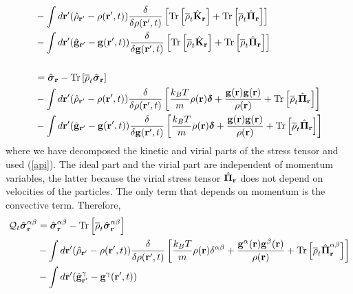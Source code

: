 \documentclass[b5paper,openright,11pt]{book}
\begin{document}
\begin{appendices}
\begin{align}
&-\int d{\bf r}'(\hat{\rho}_{{\bf r}'}-\rho({\bf r}',t))
\frac{\delta}{\delta \rho({\bf r}',t)}
\left[{\rm Tr}\left[\overline{\rho}_{t} \hat{\bf K}_{{\bf r}}\right]+{\rm Tr}\left[\overline{\rho}_{t} \hat{\boldsymbol{\Pi}}_{{\bf r}}\right]\right]
\nonumber\\
&-\int d{\bf r}'(\hat{\bf g}_{{\bf r}'}-{\bf g}({\bf r}',t))
\frac{\delta}{\delta {\bf g}({\bf r}',t)}
\left[{\rm Tr}\left[\overline{\rho}_{t} \hat{\bf K}_{{\bf r}}\right]+{\rm Tr}\left[\overline{\rho}_{t} \hat{\boldsymbol{\Pi}}_{{\bf r}}\right]\right]
\nonumber\\
\nonumber\\
&=\hat{\boldsymbol{\sigma}}_{{\bf r}}- {\rm Tr}\left[\overline{\rho}_{t} \hat{\boldsymbol{\sigma}}_{{\bf r}}\right]
\nonumber\\
&-\int d{\bf r}'(\hat{\rho}_{{\bf r}'}-\rho({\bf r}',t))
\frac{\delta}{\delta \rho({\bf r}',t)}
\left[
 \frac{k_BT}{m}\rho({\bf r})\boldsymbol{\delta}
+\frac{{\bf g}({\bf r}){\bf g}({\bf r})}{\rho({\bf r})}
+{\rm Tr}\left[\overline{\rho}_{t} \hat{\boldsymbol{\Pi}}_{{\bf r}}\right]\right]
\nonumber\\
&-\int d{\bf r}'(\hat{\bf g}_{{\bf r}'}-{\bf g}({\bf r}',t))
\frac{\delta}{\delta {\bf g}({\bf r}',t)}
\left[
 \frac{k_BT}{m}\rho({\bf r})\boldsymbol{\delta}
+\frac{{\bf g}({\bf r}){\bf g}({\bf r})}{\rho({\bf r})}
+{\rm Tr}\left[\overline{\rho}_{t} \hat{\boldsymbol{\Pi}}_{{\bf r}}\right]\right]
\label{QS}
\end{align}
where we  have decomposed the kinetic  and virial parts of  the stress
tensor and used  (\ref{api}).  The ideal part and the  virial part are
independent  of  momentum variables,  the  latter  because the  virial
stress  tensor $  \hat{\boldsymbol{\Pi}}_{\bf r}$  does not  depend on
velocities of the particles. The only term that depends on momentum is
the convective term. Therefore,
\begin{align}
  {\cal Q}_t\hat{\boldsymbol{\sigma}}^{\alpha\beta}_{{\bf r}}&=
\hat{\boldsymbol{\sigma}}^{\alpha\beta}_{{\bf r}}-{\rm Tr}\left[\overline{\rho}_t\hat{\boldsymbol{\sigma}}^{\alpha\beta}_{{\bf r}}\right]
\nonumber\\
&-\int d{\bf r}'(\hat{\rho}_{{\bf r}'}-\rho({\bf r}',t))
\frac{\delta}{\delta \rho({\bf r}',t)}
\left[
 \frac{k_BT}{m}\rho({\bf r})\delta^{\alpha\beta}
+\frac{{\bf g}^\alpha({\bf r}){\bf g}^\beta({\bf r})}{\rho({\bf r})}
+{\rm Tr}\left[\overline{\rho}_{t} \hat{\boldsymbol{\Pi}}^{\alpha\beta}_{{\bf r}}\right]\right]
\nonumber\\
&-\int d{\bf r}'(\hat{\bf g}^\gamma_{{\bf r}'}-{\bf g}^\gamma({\bf r}',t))

\end{align}
\end{appendices}
\end{document}
